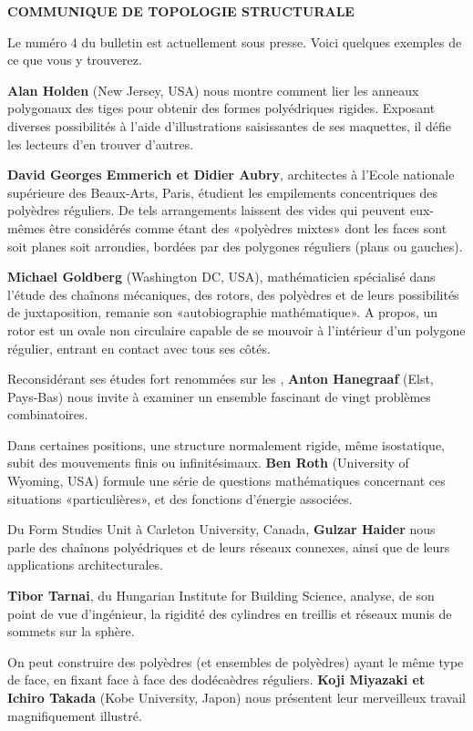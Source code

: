 \begin{center}\textbf{\Large COMMUNIQUE DE TOPOLOGIE STRUCTURALE}\end{center}

Le numéro 4 du bulletin est actuellement sous presse. Voici quelques exemples de ce que vous y trouverez.

\begin{minipage}[t]{.50\linewidth}
\textbf{Alan Holden} (New Jersey, USA) nous montre comment lier les anneaux polygonaux des tiges pour obtenir des formes polyédriques rigides. Exposant diverses possibilités à l'aide d'illustrations saisissantes de ses maquettes, il défie les lecteurs d'en trouver d'autres.

\textbf{David Georges Emmerich et Didier Aubry}, architectes à l'Ecole nationale supérieure des Beaux-Arts, Paris, étudient les empilements concentriques des polyèdres réguliers. De tels arrangements laissent des vides qui peuvent eux-mêmes être considérés comme étant des «polyèdres mixtes» dont les faces sont soit planes soit arrondies, bordées par des polygones réguliers (plans ou gauches).

\textbf{Michael Goldberg} (Washington DC, USA), mathématicien spécialisé dans l'étude des chaînons mécaniques, des rotors, des polyèdres et de leurs possibilités de juxtaposition, remanie son «autobiographie mathématique». A propos, un rotor est un ovale non circulaire capable de se mouvoir à l'intérieur d'un polygone régulier, entrant en contact avec tous ses côtés.

Reconsidérant ses études fort renommées sur les , \textbf{Anton Hanegraaf} (Elst, Pays-Bas) nous invite à examiner un ensemble fascinant de vingt problèmes combinatoires.

Dans certaines positions, une structure normalement rigide, même isostatique, subit des mouvements finis ou infinitésimaux. \textbf{Ben Roth} (University of Wyoming, USA) formule une série de questions mathématiques concernant ces situations «particulières», et des fonctions d'énergie associées.

Du Form Studies Unit à Carleton University, Canada, \textbf{Gulzar Haider} nous parle des chaînons polyédriques et de leurs réseaux connexes, ainsi que de leurs applications architecturales.

\textbf{Tibor Tarnai}, du Hungarian Institute for Building Science, analyse, de son point de vue d'ingénieur, la rigidité des cylindres en treillis et réseaux munis de sommets sur la sphère.

On peut construire des polyèdres (et ensembles de polyèdres) ayant le même type de face, en fixant face à face des dodécaèdres réguliers. \textbf{Koji Miyazaki et Ichiro Takada} (Kobe University, Japon) nous présentent leur merveilleux travail magnifiquement illustré.
\end{minipage}\hfill
